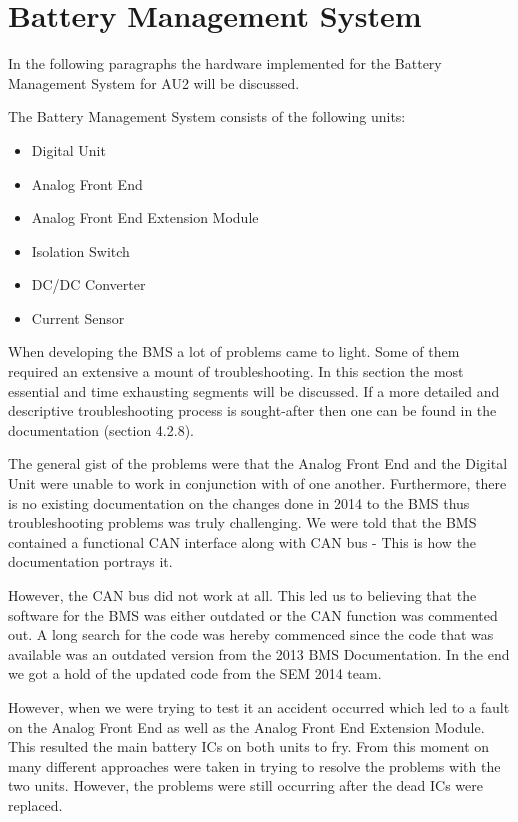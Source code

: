 \section{Battery Management System}
In the following paragraphs the hardware implemented for the Battery Management System for AU2 will be discussed. 

The Battery Management System consists of the following units:
\begin{itemize}
	\item{Digital Unit}
	\item{Analog Front End}
	\item{Analog Front End Extension Module}
	\item{Isolation Switch}
	\item{DC/DC Converter}
	\item{Current Sensor}
\end{itemize}

When developing the BMS a lot of problems came to light. Some of them required an extensive a mount of troubleshooting. In this section the most essential and time exhausting segments will be discussed. If a more detailed and descriptive troubleshooting process is sought-after then one can be found in the documentation\cite{AU2} (section 4.2.8).

The general gist of the problems were that the Analog Front End and the Digital Unit were unable to work in conjunction with of one another. Furthermore, there is no existing documentation on the changes done in 2014 to the BMS thus troubleshooting problems was truly challenging.
We were told that the BMS contained a functional CAN interface along with CAN bus - This is how the documentation portrays it. 

However, the CAN bus did not work at all. This led us to believing that the software for the BMS was either outdated or the CAN function was commented out. A long search for the code was hereby commenced since the code that was available was an outdated version from the 2013 BMS Documentation\cite{BMSDocumentation}. In the end we got a hold of the updated code from the SEM 2014 team.

However, when we were trying to test it an accident occurred which led to a fault on the Analog Front End as well as the Analog Front End Extension Module. This resulted the main battery ICs on both units to fry.
From this moment on many different approaches were taken in trying to resolve the problems with the two units. However, the problems were still occurring after the dead ICs were replaced.

